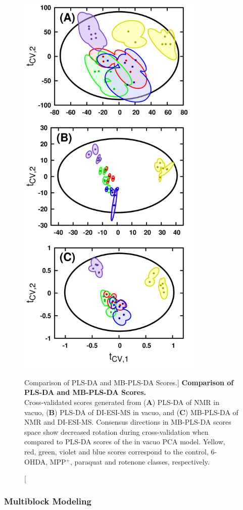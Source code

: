 \begin{figure}
\includegraphics[width=3.5in]{figs/apps/10-mbpls-t.png}
\caption
      [Comparison of PLS-DA and MB-PLS-DA Scores.]{
  {\bf Comparison of PLS-DA and MB-PLS-DA Scores.}
  \\
  Cross-validated scores generated from ({\bf A}) PLS-DA of \hnmr{} NMR in
  vacuo, ({\bf B}) PLS-DA of DI-ESI-MS in vacuo, and ({\bf C}) MB-PLS-DA of
  \hnmr{} NMR and DI-ESI-MS. Consensus directions in MB-PLS-DA scores space
  show decreased rotation during cross-validation when compared to PLS-DA
  scores of the in vacuo PCA model. Yellow, red, green, violet and blue scores
  correspond to the control, 6-OHDA, MPP$^+$, paraquat and rotenone classes,
  respectively.
}
\end{figure}

\subsubsection{Multiblock Modeling}


